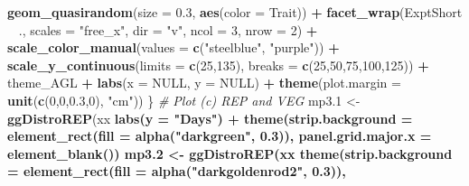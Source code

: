 \documentclass[
]{article}
\newenvironment{Shaded}{\begin{snugshade}}{\end{snugshade}}
\newcommand{\CommentTok}[1]{\textcolor[rgb]{0.56,0.35,0.01}{\textit{#1}}}
\newcommand{\DataTypeTok}[1]{\textcolor[rgb]{0.13,0.29,0.53}{#1}}
\newcommand{\DecValTok}[1]{\textcolor[rgb]{0.00,0.00,0.81}{#1}}
\newcommand{\FloatTok}[1]{\textcolor[rgb]{0.00,0.00,0.81}{#1}}
\newcommand{\KeywordTok}[1]{\textcolor[rgb]{0.13,0.29,0.53}{\textbf{#1}}}
\newcommand{\NormalTok}[1]{#1}
\newcommand{\OperatorTok}[1]{\textcolor[rgb]{0.81,0.36,0.00}{\textbf{#1}}}
\newcommand{\OtherTok}[1]{\textcolor[rgb]{0.56,0.35,0.01}{#1}}
\newcommand{\StringTok}[1]{\textcolor[rgb]{0.31,0.60,0.02}{#1}}
\begin{document}
\begin{Shaded}
\begin{Highlighting}[]
{{{{{{{{{{{{{{\StringTok{    }\KeywordTok{geom_quasirandom}\NormalTok{(}\DataTypeTok{size =} \FloatTok{0.3}\NormalTok{, }\KeywordTok{aes}\NormalTok{(}\DataTypeTok{color =}\NormalTok{ Trait)) }\OperatorTok{+}
\StringTok{    }\KeywordTok{facet_wrap}\NormalTok{(ExptShort }\OperatorTok{~}\StringTok{ }\NormalTok{., }\DataTypeTok{scales =} \StringTok{"free_x"}\NormalTok{, }\DataTypeTok{dir =} \StringTok{"v"}\NormalTok{, }\DataTypeTok{ncol =} \DecValTok{3}\NormalTok{, }\DataTypeTok{nrow =} \DecValTok{2}\NormalTok{) }\OperatorTok{+}
\StringTok{    }\KeywordTok{scale_color_manual}\NormalTok{(}\DataTypeTok{values =} \KeywordTok{c}\NormalTok{(}\StringTok{"steelblue"}\NormalTok{, }\StringTok{"purple"}\NormalTok{)) }\OperatorTok{+}
\StringTok{    }\KeywordTok{scale_y_continuous}\NormalTok{(}\DataTypeTok{limits =} \KeywordTok{c}\NormalTok{(}\DecValTok{25}\NormalTok{,}\DecValTok{135}\NormalTok{), }\DataTypeTok{breaks =} \KeywordTok{c}\NormalTok{(}\DecValTok{25}\NormalTok{,}\DecValTok{50}\NormalTok{,}\DecValTok{75}\NormalTok{,}\DecValTok{100}\NormalTok{,}\DecValTok{125}\NormalTok{)) }\OperatorTok{+}
\StringTok{    }\NormalTok{theme_AGL }\OperatorTok{+}\StringTok{ }\KeywordTok{labs}\NormalTok{(}\DataTypeTok{x =} \OtherTok{NULL}\NormalTok{, }\DataTypeTok{y =} \OtherTok{NULL}\NormalTok{) }\OperatorTok{+}\StringTok{ }
\StringTok{    }\KeywordTok{theme}\NormalTok{(}\DataTypeTok{plot.margin =} \KeywordTok{unit}\NormalTok{(}\KeywordTok{c}\NormalTok{(}\DecValTok{0}\NormalTok{,}\DecValTok{0}\NormalTok{,}\FloatTok{0.3}\NormalTok{,}\DecValTok{0}\NormalTok{), }\StringTok{"cm"}\NormalTok{))}
\NormalTok{\}}
\CommentTok{# Plot (c) REP and VEG}
\NormalTok{mp3}\FloatTok{.1}\NormalTok{ <-}\StringTok{ }\KeywordTok{ggDistroREP}\NormalTok{(xx }\OperatorTok{%
\StringTok{  }\KeywordTok{labs}\NormalTok{(}\DataTypeTok{y =} \StringTok{"Days"}\NormalTok{) }\OperatorTok{+}
\StringTok{  }\KeywordTok{theme}\NormalTok{(}\DataTypeTok{strip.background =} \KeywordTok{element_rect}\NormalTok{(}\DataTypeTok{fill =} \KeywordTok{alpha}\NormalTok{(}\StringTok{"darkgreen"}\NormalTok{, }\FloatTok{0.3}\NormalTok{)),}
        \DataTypeTok{panel.grid.major.x =} \KeywordTok{element_blank}\NormalTok{())}
\NormalTok{mp3}\FloatTok{.2}\NormalTok{ <-}\StringTok{ }\KeywordTok{ggDistroREP}\NormalTok{(xx }\OperatorTok{%
\StringTok{  }\KeywordTok{theme}\NormalTok{(}\DataTypeTok{strip.background =} \KeywordTok{element_rect}\NormalTok{(}\DataTypeTok{fill =} \KeywordTok{alpha}\NormalTok{(}\StringTok{"darkgoldenrod2"}\NormalTok{, }\FloatTok{0.3}\NormalTok{)),}
}}}}}}}}}}}}}}}}
\end{Highlighting}
\end{Shaded}
\end{document}
